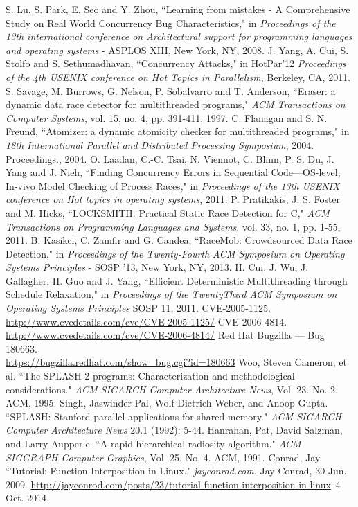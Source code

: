 \documentclass[letterpaper,twocolumn,10pt]{article}
\begin{document}

\begin{thebibliography}{13}
S. Lu, S. Park, E. Seo and Y. Zhou, ``Learning from mistakes - A Comprehensive Study on Real World Concurrency Bug Characteristics," in \emph{Proceedings of the 13th international conference on Architectural support for programming languages and operating systems} - ASPLOS XIII, New York, NY, 2008.
J. Yang, A. Cui, S. Stolfo and S. Sethumadhavan, ``Concurrency Attacks," in HotPar'12 \emph{Proceedings of the 4th USENIX conference on Hot Topics in Parallelism}, Berkeley, CA, 2011.
S. Savage, M. Burrows, G. Nelson, P. Sobalvarro and T. Anderson, ``Eraser: a dynamic data race detector for multithreaded programs," \emph{ACM Transactions on Computer Systems}, vol. 15, no. 4, pp. 391-411, 1997.
C. Flanagan and S. N. Freund, ``Atomizer: a dynamic atomicity checker for multithreaded programs," in \emph{18th International Parallel and Distributed Processing Symposium}, 2004. Proceedings., 2004.
O. Laadan, C.-C. Tsai, N. Viennot, C. Blinn, P. S. Du, J. Yang and J. Nieh, ``Finding Concurrency Errors in Sequential Code—OS-level, In-vivo Model Checking of Process Races," in \emph{Proceedings of the 13th USENIX conference on Hot topics in operating systems}, 2011.
P. Pratikakis, J. S. Foster and M. Hicks, ``LOCKSMITH: Practical Static Race Detection for C," \emph{ACM Transactions on Programming Languages and Systems}, vol. 33, no. 1, pp. 1-55, 2011.
B. Kasikci, C. Zamfir and G. Candea, ``RaceMob: Crowdsourced Data Race Detection," in \emph{Proceedings of the Twenty-Fourth ACM Symposium on Operating Systems Principles} - SOSP '13, New York, NY, 2013.
H. Cui, J. Wu, J. Gallagher, H. Guo and J. Yang, ``Efficient Deterministic Multithreading through Schedule Relaxation," in \emph{Proceedings of the TwentyThird ACM Symposium on Operating Systems Principles} SOSP 11, 2011.
CVE-2005-1125. \url{http://www.cvedetails.com/cve/CVE-2005-1125/}
CVE-2006-4814. \url{http://www.cvedetails.com/cve/CVE-2006-4814/}
Red Hat Bugzilla --- Bug 180663.\\\url{https://bugzilla.redhat.com/show_bug.cgi?id=180663}
Woo, Steven Cameron, et al. ``The SPLASH-2 programs: Characterization and methodological considerations." \emph{ACM SIGARCH Computer Architecture News}, Vol. 23. No. 2. ACM, 1995.
Singh, Jaswinder Pal, Wolf-Dietrich Weber, and Anoop Gupta. ``SPLASH: Stanford parallel applications for shared-memory." \emph{ACM SIGARCH Computer Architecture News} 20.1 (1992): 5-44.
Hanrahan, Pat, David Salzman, and Larry Aupperle. ``A rapid hierarchical radiosity algorithm." \emph{ACM SIGGRAPH Computer Graphics}, Vol. 25. No. 4. ACM, 1991.
Conrad, Jay. ``Tutorial: Function Interposition in Linux." \emph{jayconrad.com.} Jay Conrad, 30 Jun. 2009. \guilsinglleft\url{http://jayconrod.com/posts/23/tutorial-function-interposition-in-linux}\guilsinglright\ 4 Oct. 2014. 
\end{thebibliography}

\end{document}
